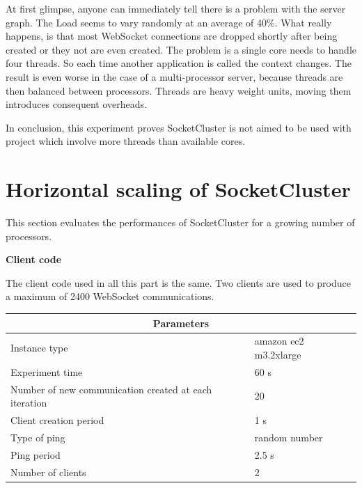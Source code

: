 At first glimpse, anyone can immediately tell there is a problem with the server
graph. The Load seems to vary randomly at an average of 40\%. What really happens, is
that most WebSocket connections are dropped shortly after being created or they 
not are even created. The problem is a single core needs to handle four threads. So each
time another application is called the context changes. The result is even worse in the case of 
a multi-processor server, because threads are then balanced between processors. Threads 
are heavy weight units, moving them introduces consequent overheads.

In conclusion, this experiment proves SocketCluster is not aimed to be used with
project which involve more threads than available cores.


\section{Horizontal scaling of SocketCluster }

This section evaluates the performances of SocketCluster for a growing number
of processors. 

\textbf{Client code}

The client code used in all this part is the same. Two clients are used to
produce a maximum of 2400 WebSocket communications.


\begin{center}
  \begin{tabular}{ | l | l |}
  \hline
  \multicolumn{2}{|c|}{Parameters} \\
  \hline
    Instance type &  amazon ec2 m3.2xlarge\\ 
    Experiment time & 60 s \\
    Number of new communication created at each iteration & 20 \\
    Client creation period & 1 s \\
    Type of ping & random number \\ 
    Ping period & 2.5 s \\ 
    Number of clients & 2 \\
  \hline
  \end{tabular}
\end{center}


